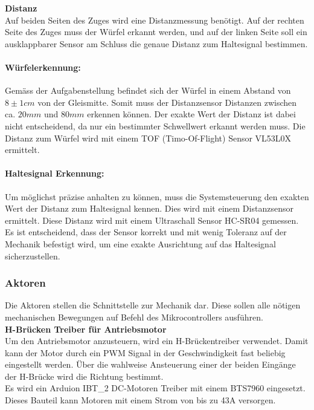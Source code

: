 \documentclass[../../main.tex]{subfiles}
\begin{document}
    \textbf{Distanz}\\
    Auf beiden Seiten des Zuges wird eine Distanzmessung benötigt. Auf der rechten Seite des Zuges muss der Würfel erkannt werden, und auf der linken Seite soll ein ausklappbarer Sensor am Schluss die genaue Distanz zum Haltesignal bestimmen.

    \paragraph{Würfelerkennung:}
    Gemäss der Aufgabenstellung befindet sich der Würfel in einem Abstand von $8\pm1cm$ von der Gleismitte. Somit muss der Distanzsensor Distanzen zwischen ca. $20mm$ und $80mm$ erkennen können. Der exakte Wert der Distanz ist dabei nicht entscheidend, da nur ein bestimmter Schwellwert erkannt werden muss. Die Distanz zum Würfel wird mit einem TOF (Timo-Of-Flight) Sensor VL53L0X ermittelt.

    \paragraph{Haltesignal Erkennung:}
    Um möglichst präzise anhalten zu können, muss die Systemsteuerung den exakten Wert der Distanz zum Haltesignal kennen. Dies wird mit einem Distanzsensor ermittelt. Diese Distanz wird mit einem Ultraschall Sensor HC-SR04 gemessen. Es ist entscheidend, dass der Sensor korrekt und mit wenig Toleranz auf der Mechanik befestigt wird, um eine exakte Ausrichtung auf das Haltesignal sicherzustellen.

    \subsubsection{Aktoren}
    Die Aktoren stellen die Schnittstelle zur Mechanik dar. Diese sollen alle nötigen mechanischen Bewegungen auf Befehl des Mikrocontrollers ausführen.\\

    \textbf{H-Brücken Treiber für Antriebsmotor}\\
    Um den Antriebsmotor anzusteuern, wird ein H-Brückentreiber verwendet. Damit kann der Motor durch ein PWM Signal in der Geschwindigkeit fast beliebig eingestellt werden. Über die wahlweise Ansteuerung einer der beiden Eingänge der H-Brücke wird die Richtung bestimmt.\\
    Es wird ein Arduion IBT\_2 DC-Motoren Treiber mit einem BTS7960 eingesetzt. Dieses Bauteil kann Motoren mit einem Strom von bis zu 43A versorgen. \\
\end{document}
